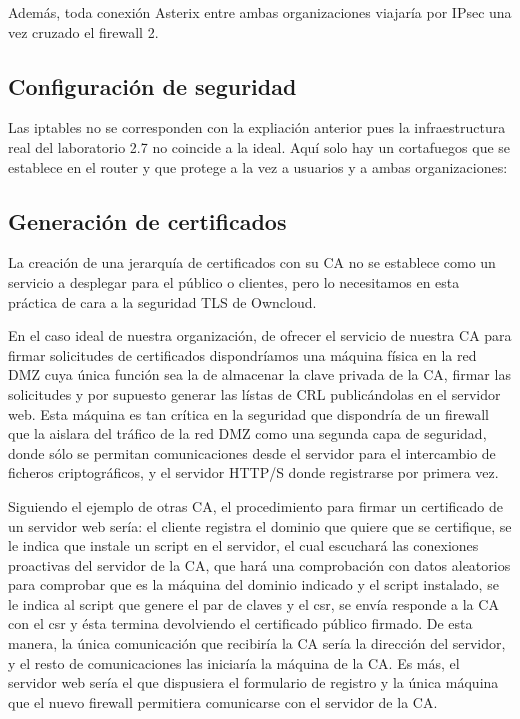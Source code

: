 \documentclass[]{article}
\begin{document}
Además, toda conexión Asterix entre ambas organizaciones viajaría por IPsec una vez cruzado el firewall 2.

\subsection{Configuración de seguridad}
Las iptables no se corresponden con la expliación anterior pues la infraestructura real del laboratorio 2.7 no coincide a la ideal. Aquí solo hay un cortafuegos que se establece en el router y que protege a la vez a usuarios y a ambas organizaciones:



\subsection{Generación de certificados}

La creación de una jerarquía de certificados con su CA no se establece como un servicio a desplegar para el público o clientes, pero lo necesitamos en esta práctica de cara a la seguridad TLS de Owncloud.

En el caso ideal de nuestra organización, de ofrecer el servicio de nuestra CA para firmar solicitudes de certificados dispondríamos una máquina física en la red DMZ cuya única función sea la de almacenar la clave privada de la CA, firmar las solicitudes y por supuesto generar las lístas de CRL publicándolas en el servidor web. Esta máquina es tan crítica en la seguridad que dispondría de un firewall que la aislara del tráfico de la red DMZ como una segunda capa de seguridad, donde sólo se permitan comunicaciones desde el servidor para el intercambio de ficheros criptográficos, y el servidor HTTP/S donde registrarse por primera vez.

Siguiendo el ejemplo de otras CA, el procedimiento para firmar un certificado de un servidor web sería: el cliente registra el dominio que quiere que se certifique, se le indica que instale un script en el servidor, el cual escuchará las conexiones proactivas del servidor de la CA, que hará una comprobación con datos aleatorios para comprobar que es la máquina del dominio indicado y el script instalado, se le indica al script que genere el par de claves y el csr, se envía responde a la CA con el csr y ésta termina devolviendo el certificado público firmado. De esta manera, la única comunicación que recibiría la CA sería la dirección del servidor, y el resto de comunicaciones las iniciaría la máquina de la CA. Es más, el servidor web sería el que dispusiera el formulario de registro y la única máquina que el nuevo firewall permitiera comunicarse con el servidor de la CA.
\end{document}
